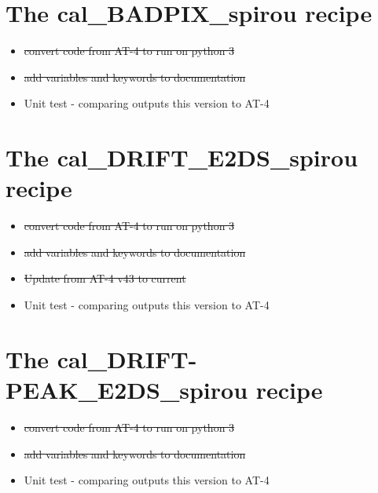 \section{The cal\_BADPIX\_spirou recipe}
\label{ch:todo:cal_BADPIX_spirou}

\begin{itemize}
	\item \sout{convert code from AT-4 to run on python 3}
	\item \sout{add variables and keywords to documentation}
	\item Unit test - comparing outputs this version to AT-4
\end{itemize}


\section{The cal\_DRIFT\_E2DS\_spirou recipe}
\label{ch:todo:cal_DRIFT_E2DS_spirou}

\begin{itemize}
	\item \sout{convert code from AT-4 to run on python 3}
	\item \sout{add variables and keywords to documentation}
	\item \sout{Update from AT-4 v43 to current}
	\item Unit test - comparing outputs this version to AT-4
\end{itemize}


\section{The cal\_DRIFT-PEAK\_E2DS\_spirou recipe}
\label{ch:todo:cal_DRIFTPEAK_E2DS_spirou}

\begin{itemize}
	\item \sout{convert code from AT-4 to run on python 3}
	\item \sout{add variables and keywords to documentation}
	\item Unit test - comparing outputs this version to AT-4
\end{itemize}


